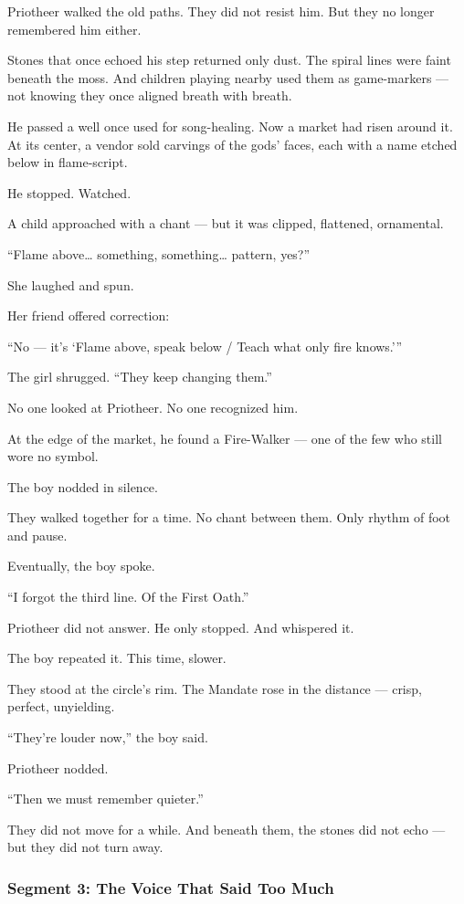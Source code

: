 \documentclass[9pt]{article}
\begin{document}
Priotheer walked the old paths.  
They did not resist him.  
But they no longer remembered him either.

Stones that once echoed his step returned only dust.  
The spiral lines were faint beneath the moss.  
And children playing nearby used them as game-markers —  
not knowing they once aligned breath with breath.

He passed a well once used for song-healing.  
Now a market had risen around it.  
At its center, a vendor sold carvings of the gods’ faces,  
each with a name etched below in flame-script.

He stopped.  
Watched.

A child approached with a chant —  
but it was clipped, flattened, ornamental.

 “Flame above… something, something… pattern, yes?”

She laughed and spun.

Her friend offered correction:

 “No — it’s ‘Flame above, speak below / Teach what only fire knows.’”

The girl shrugged.  
 “They keep changing them.”

No one looked at Priotheer.  
No one recognized him.

At the edge of the market, he found a Fire-Walker — one of the few who still wore no symbol.

The boy nodded in silence.

They walked together for a time.  
No chant between them.  
Only rhythm of foot and pause.

Eventually, the boy spoke.

 “I forgot the third line.  
 Of the First Oath.”

Priotheer did not answer.  
He only stopped.  
And whispered it.

The boy repeated it.  
This time, slower.

They stood at the circle’s rim.  
The Mandate rose in the distance — crisp, perfect, unyielding.

 “They’re louder now,” the boy said.

Priotheer nodded.

 “Then we must remember quieter.”

They did not move for a while.  
And beneath them, the stones did not echo —  
but they did not turn away.

\newpage

\subsubsection*{Segment 3: The Voice That Said Too Much}
\end{document}
